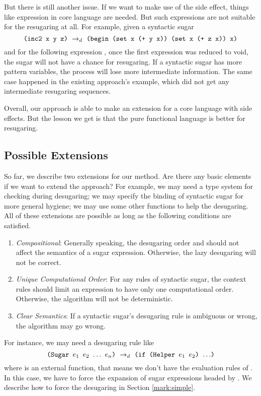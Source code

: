 But there is still another issue. If we want to make use of the side effect, things like  expression in core language are needed. But such expressions are not suitable for the resugaring at all. For example, given a syntactic sugar 
\[\texttt{(inc2 x y z)} ~\rightarrow_d~ \texttt{(begin (set x (+ y x)) (set x (+ z x)) x)}\]
and for the following expression , once the first  expression was reduced to void, the  sugar will not have a chance for resugaring. If a syntactic sugar has more pattern variables, the process will lose more intermediate information. The same case happened in the existing approach\cite{resugaring}'s  example, which did not get any intermediate resugaring sequences.

Overall, our approach is able to make an extension for a core language with side effects. But the lesson we get is that the pure functional language is better for resugaring.


\subsection{Possible Extensions}

So far, we describe two extensions for our method. Are there any basic elements if we want to extend the approach? For example, we may need a type system for checking during desugaring; we may specify the binding of syntactic sugar for more general hygiene; we may use some other functions to help the desugaring. All of these extensions are possible as long as the following conditions are satisfied.
\begin{enumerate}
	\item \emph{Compositional}: Generally speaking, the desugaring order and should not affect the semantics of a sugar expression. Otherwise, the lazy desugaring will not be correct.
	\item \emph{Unique Computational Order}: For any rules of syntactic sugar, the context rules should limit an expression to have only one computational order. Otherwise, the algorithm  will not be deterministic.
	\item \emph{Clear Semantics}: If a syntactic sugar's desugaring rule is ambiguous or wrong, the algorithm  may go wrong.
\end{enumerate}

\todo{}
For instance, we may need a desugaring rule like
\[
\texttt{(Sugar $e_1$ $e_2$ $\ldots$ $e_n$)} ~\rightarrow_d~ \texttt{(if (Helper $e_1$ $e_2$) $\ldots$)}
\]
where  is an external function, that means we don't have the evaluation rules of . In this case, we have to force the expansion of sugar expressions headed by . We describe how to force the desugaring in Section \ref{mark:simple}.




